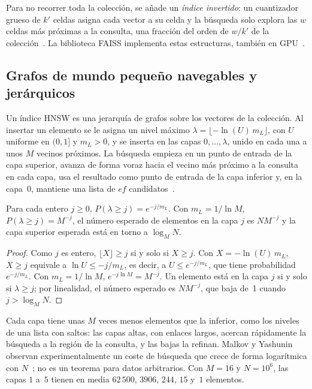 Para no recorrer toda la colección, se añade un \emph{índice invertido}: un cuantizador grueso de $k'$ celdas asigna cada vector a su celda y la búsqueda solo explora las $w$ celdas más próximas a la consulta, una fracción del orden de $w/k'$ de la colección~\cite{jegou}. La biblioteca FAISS implementa estas estructuras, también en GPU~\cite{faiss}.

\subsection{Grafos de mundo pequeño navegables y jerárquicos}

\begin{definicion}[HNSW]\label{def:hnsw}
Un índice HNSW es una jerarquía de grafos sobre los vectores de la colección. Al insertar un elemento se le asigna un nivel máximo $\lambda=\lfloor-\ln(U)\,m_L\rfloor$, con $U$ uniforme en $(0,1]$ y $m_L>0$, y se inserta en las capas $0,\dots,\lambda$, unido en cada una a unos $M$ vecinos próximos. La búsqueda empieza en un punto de entrada de la capa superior, avanza de forma voraz hacia el vecino más próximo a la consulta en cada capa, usa el resultado como punto de entrada de la capa inferior y, en la capa~0, mantiene una lista de $\mathit{ef}$ candidatos~\cite{hnsw}.
\end{definicion}

\begin{proposicion}\label{prop:hnsw}
Para cada entero $j\ge 0$, $P(\lambda\ge j)=e^{-j/m_L}$. Con $m_L=1/\ln M$, $P(\lambda\ge j)=M^{-j}$, el número esperado de elementos en la capa $j$ es $NM^{-j}$ y la capa superior esperada está en torno a $\log_M N$.
\end{proposicion}

\begin{proof}
Como $j$ es entero, $\lfloor X\rfloor\ge j$ si y solo si $X\ge j$. Con $X=-\ln(U)\,m_L$, $X\ge j$ equivale a $\ln U\le -j/m_L$, es decir, a $U\le e^{-j/m_L}$, que tiene probabilidad $e^{-j/m_L}$. Con $m_L=1/\ln M$, $e^{-j\ln M}=M^{-j}$. Un elemento está en la capa $j$ si y solo si $\lambda\ge j$; por linealidad, el número esperado es $NM^{-j}$, que baja de~1 cuando $j>\log_M N$.
\end{proof}

Cada capa tiene unas $M$ veces menos elementos que la inferior, como los niveles de una lista con saltos: las capas altas, con enlaces largos, acercan rápidamente la búsqueda a la región de la consulta, y las bajas la refinan. Malkov y Yashunin observan experimentalmente un coste de búsqueda que crece de forma logarítmica con $N$~\cite{hnsw}; no es un teorema para datos arbitrarios. Con $M=16$ y $N=10^{6}$, las capas $1$ a~$5$ tienen en media $62\,500$, $3906$, $244$, $15$ y~$1$ elementos.

